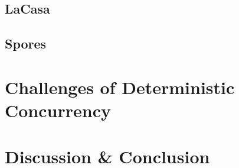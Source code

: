 \documentclass{kththesis}
\begin{document}

\section{LaCasa}
\label{sec:lacasa}


\section{Spores}
\label{sec:spores}




\chapter{Challenges of Deterministic Concurrency}
\label{cha:challenges}








\chapter{Discussion \& Conclusion}
\label{cha:disc_concl}




\printbibliography[heading=bibintoc] %

\appendix




\end{document}
